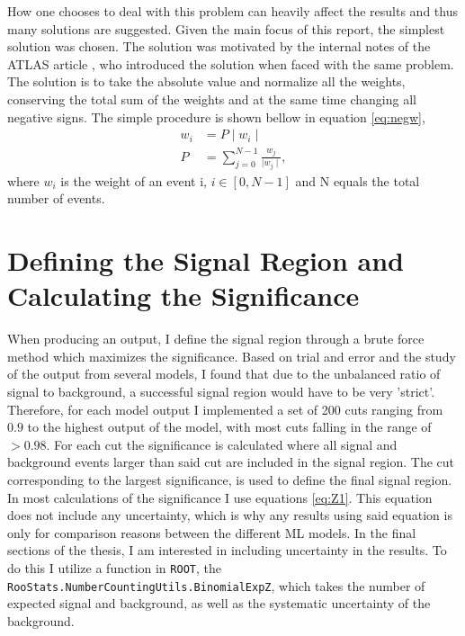 How one chooses to deal with this problem can heavily affect the results and thus many solutions 
are suggested. Given the main focus of this report, the simplest solution was chosen. The solution was 
motivated by the internal notes of the \ac{ATLAS} article \cite{Aad:2800889}, who introduced the solution 
when faced with the same problem. The solution is to take the absolute value and normalize all the weights, 
conserving the total sum of the weights and at the same time changing all negative signs. The simple procedure 
is shown bellow in equation \ref{eq:negw},
\begin{align}\label{eq:negw}
    w_i & = P \mid w_i \mid\,  \\
    P  & =  \sum_{j=0}^{N-1}\frac{ w_j}{\mid w_j \mid},
\end{align}
where $w_i$ is the weight of an event i, $i \in [0,N-1]$ and N equals the total number of events.
\section{Defining the Signal Region and Calculating the Significance}
When producing an output, I define the signal region through a brute force method which maximizes the significance. 
Based on trial and error and the study of the output from several models, I found that due to the unbalanced ratio of 
signal to background, a successful signal region would have to be very 'strict'. Therefore, for each model output I implemented a 
set of 200 cuts ranging from $0.9$ to the highest output of the model, with most cuts falling in the range of $>0.98$. For each cut
the significance is calculated where all signal and background events larger than said cut are included in the signal region. The cut 
corresponding to the largest significance, is used to define the final signal region.  
\\
In most calculations of the significance I use equations \ref{eq:Z1}. This equation does not include any 
uncertainty, which is why any results using said equation is only for comparison reasons between the different \ac{ML}
models. In the final sections of the thesis, I am interested in including uncertainty in the results. To do this I utilize 
a function in \verb!ROOT!, the \texttt{RooStats.NumberCountingUtils.BinomialExpZ}, which takes the number of expected signal and background, 
as well as the systematic uncertainty of the background.